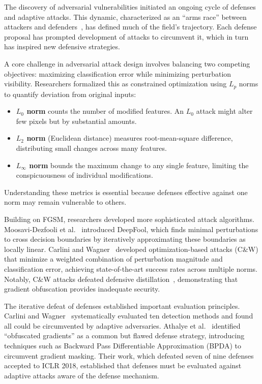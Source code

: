 \documentclass[11pt,a4paper]{article}
\begin{document}
The discovery of adversarial vulnerabilities initiated an ongoing cycle of defenses and adaptive attacks. This dynamic, characterized as an ``arms race'' between attackers and defenders~\citep{carlini2019evaluating}, has defined much of the field's trajectory. Each defense proposal has prompted development of attacks to circumvent it, which in turn has inspired new defensive strategies.

A core challenge in adversarial attack design involves balancing two competing objectives: maximizing classification error while minimizing perturbation visibility. Researchers formalized this as constrained optimization using $L_p$ norms to quantify deviation from original inputs:

\begin{itemize}[noitemsep]
    \item \textbf{$L_0$ norm} counts the number of modified features. An $L_0$ attack might alter few pixels but by substantial amounts.
    \item \textbf{$L_2$ norm} (Euclidean distance) measures root-mean-square difference, distributing small changes across many features.
    \item \textbf{$L_\infty$ norm} bounds the maximum change to any single feature, limiting the conspicuousness of individual modifications.
\end{itemize}

Understanding these metrics is essential because defenses effective against one norm may remain vulnerable to others.

Building on FGSM, researchers developed more sophisticated attack algorithms. Moosavi-Dezfooli et al.~\citep{moosavi2016deepfool} introduced DeepFool, which finds minimal perturbations to cross decision boundaries by iteratively approximating these boundaries as locally linear. Carlini and Wagner~\citep{carlini2017towards} developed optimization-based attacks (C\&W) that minimize a weighted combination of perturbation magnitude and classification error, achieving state-of-the-art success rates across multiple norms. Notably, C\&W attacks defeated defensive distillation~\citep{papernot2016distillation}, demonstrating that gradient obfuscation provides inadequate security.

The iterative defeat of defenses established important evaluation principles. Carlini and Wagner~\citep{carlini2017detecting} systematically evaluated ten detection methods and found all could be circumvented by adaptive adversaries. Athalye et al.~\citep{athalye2018obfuscated} identified ``obfuscated gradients'' as a common but flawed defense strategy, introducing techniques such as Backward Pass Differentiable Approximation (BPDA) to circumvent gradient masking. Their work, which defeated seven of nine defenses accepted to ICLR 2018, established that defenses must be evaluated against adaptive attacks aware of the defense mechanism.
\end{document}
